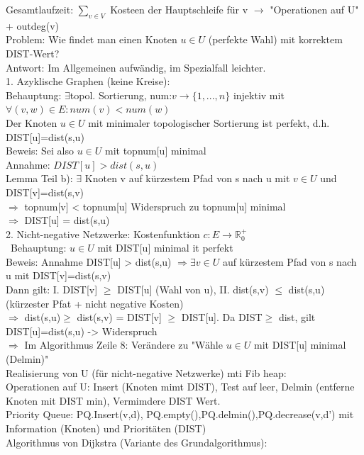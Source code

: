 \documentclass[a4paper]{article}
\begin{document}
Gesamtlaufzeit: $\sum_{v\in V}$ Kosteen der Hauptschleife für v $\rightarrow$ "Operationen auf U" + outdeg(v)\\
Problem: Wie findet man einen Knoten $u\in U$ (perfekte Wahl) mit korrektem DIST-Wert?\\
Antwort: Im Allgemeinen aufwändig, im Spezialfall leichter.\\
1. Azyklische Graphen (keine Kreise):\\
Behauptung: $\exists $topol. Sortierung, num:$v\rightarrow\{1,...,n\}$ injektiv mit $\forall (v,w)\in E: num(v)<num(w)$\\
Der Knoten $u\in U$ mit minimaler topologischer Sortierung ist perfekt, d.h. DIST[u]=dist(s,u)\\
Beweis: Sei also $u\in U$ mit topnum[u] minimal\\
  Annahme: $DIST[u] > dist(s,u)$\\
  Lemma Teil b): $\exists$ Knoten v auf kürzestem Pfad von s nach u mit $v\in U$ und DIST[v]=dist(s,v)\\
  $\Rightarrow$ topnum[v] < topnum[u] Widerspruch zu topnum[u] minimal\\
  $\Rightarrow$ DIST[u] = dist(s,u)\\
2. Nicht-negative Netzwerke: Kostenfunktion $c:E\rightarrow\mathbb{R}_0^+$\\\
  Behauptung: $u\in U$ mit DIST[u] minimal it perfekt\\
  Beweis: Annahme DIST[u] > dist(s,u) $\Rightarrow \exists v\in U$ auf kürzestem Pfad von s nach u mit DIST[v]=dist(s,v)\\
  Dann gilt: I. DIST[v] $\geq$ DIST[u] (Wahl von u), II. dist(s,v) $\leq$ dist(s,u) (kürzester Pfat + nicht negative Kosten)\\
  $\Rightarrow$ dist(s,u)$\geq$ dist(s,v) = DIST[v] $\geq$ DIST[u]. Da DIST$\geq$ dist, gilt DIST[u]=dist(s,u) -> Widerspruch\\
$\Rightarrow$ Im Algorithmus Zeile 8: Verändere zu "Wähle $u\in U $ mit DIST[u] minimal (Delmin)"\\
Realisierung von U (für nicht-negative Netzwerke) mti Fib heap:\\
Operationen auf U: Insert (Knoten mimt DIST), Test auf leer, Delmin (entferne Knoten mit DIST min), Vermimdere DIST Wert.\\
Priority Queue: PQ.Insert(v,d), PQ.empty(),PQ.delmin(),PQ.decrease(v,d') mit Information (Knoten) und Prioritäten (DIST)\\
Algorithmus von Dijkstra (Variante des Grundalgorithmus):\\
\end{document}
